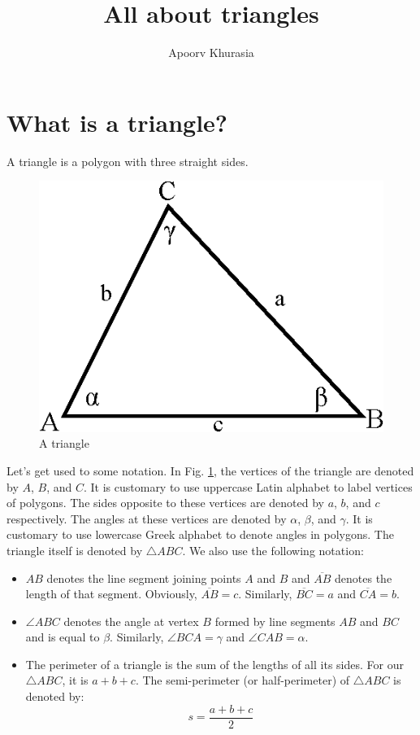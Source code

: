 \documentclass[11pt]{article}
\begin{document}
\title{All about triangles}
\author{Apoorv Khurasia}
\maketitle
\section{What is a triangle?}
A triangle is a polygon with three straight sides.
\begin{figure}[!htb]
    \centering
    \includegraphics{triangle_basics.eps}
    \caption{A triangle}
    \label{fig:triangle}
\end{figure}
Let's get used to some notation. In Fig. \ref{fig:triangle}, the vertices of the triangle are denoted by $A$, $B$, and $C$. It is customary to use uppercase Latin alphabet to label vertices of polygons. The sides opposite to these vertices are denoted by $a$, $b$, and $c$ respectively. The angles at these vertices are denoted by $\alpha$, $\beta$, and $\gamma$. It is customary to use lowercase Greek alphabet to denote angles in polygons. The triangle itself is denoted by $\triangle ABC$.
\newline
We also use the following notation:
\begin{itemize}
    \item $AB$ denotes the line segment joining points $A$ and $B$ and $\overline{AB}$ denotes the length of that segment. Obviously, $\overline{AB} = c$. Similarly, $\overline{BC} = a$ and $\overline{CA} = b$.
    \item $\angle ABC$ denotes the angle at vertex $B$ formed by line segments $AB$ and $BC$ and is equal to $\beta$. Similarly, $\angle BCA = \gamma$ and $\angle CAB = \alpha$.
    \item The perimeter of a triangle is the sum of the lengths of all its sides. For our $\triangle ABC$, it is $a + b + c$. The semi-perimeter (or half-perimeter) of $\triangle ABC$ is denoted by:
          \begin{equation*}s = \frac{a + b + c}{2}\end{equation*}
\end{itemize}
\end{document}
